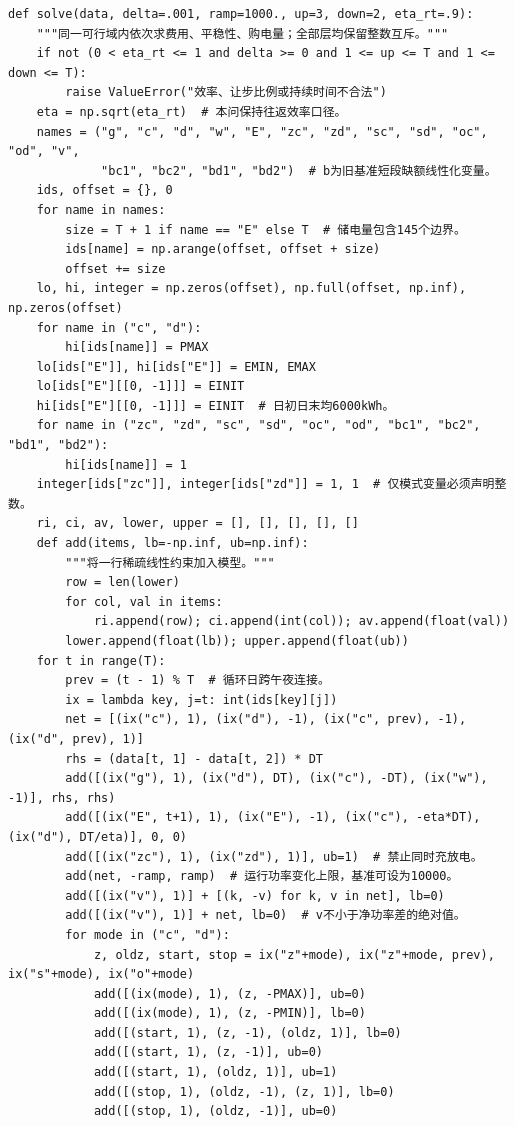 \documentclass[withoutpreface,bwprint]{cumcmthesis}
\begin{document}
\begin{appendices}
\begin{lstlisting}
def solve(data, delta=.001, ramp=1000., up=3, down=2, eta_rt=.9):
    """同一可行域内依次求费用、平稳性、购电量；全部层均保留整数互斥。"""
    if not (0 < eta_rt <= 1 and delta >= 0 and 1 <= up <= T and 1 <= down <= T):
        raise ValueError("效率、让步比例或持续时间不合法")
    eta = np.sqrt(eta_rt)  # 本问保持往返效率口径。
    names = ("g", "c", "d", "w", "E", "zc", "zd", "sc", "sd", "oc", "od", "v",
             "bc1", "bc2", "bd1", "bd2")  # b为旧基准短段缺额线性化变量。
    ids, offset = {}, 0
    for name in names:
        size = T + 1 if name == "E" else T  # 储电量包含145个边界。
        ids[name] = np.arange(offset, offset + size)
        offset += size
    lo, hi, integer = np.zeros(offset), np.full(offset, np.inf), np.zeros(offset)
    for name in ("c", "d"):
        hi[ids[name]] = PMAX
    lo[ids["E"]], hi[ids["E"]] = EMIN, EMAX
    lo[ids["E"][[0, -1]]] = EINIT
    hi[ids["E"][[0, -1]]] = EINIT  # 日初日末均6000kWh。
    for name in ("zc", "zd", "sc", "sd", "oc", "od", "bc1", "bc2", "bd1", "bd2"):
        hi[ids[name]] = 1
    integer[ids["zc"]], integer[ids["zd"]] = 1, 1  # 仅模式变量必须声明整数。
    ri, ci, av, lower, upper = [], [], [], [], []
    def add(items, lb=-np.inf, ub=np.inf):
        """将一行稀疏线性约束加入模型。"""
        row = len(lower)
        for col, val in items:
            ri.append(row); ci.append(int(col)); av.append(float(val))
        lower.append(float(lb)); upper.append(float(ub))
    for t in range(T):
        prev = (t - 1) % T  # 循环日跨午夜连接。
        ix = lambda key, j=t: int(ids[key][j])
        net = [(ix("c"), 1), (ix("d"), -1), (ix("c", prev), -1), (ix("d", prev), 1)]
        rhs = (data[t, 1] - data[t, 2]) * DT
        add([(ix("g"), 1), (ix("d"), DT), (ix("c"), -DT), (ix("w"), -1)], rhs, rhs)
        add([(ix("E", t+1), 1), (ix("E"), -1), (ix("c"), -eta*DT), (ix("d"), DT/eta)], 0, 0)
        add([(ix("zc"), 1), (ix("zd"), 1)], ub=1)  # 禁止同时充放电。
        add(net, -ramp, ramp)  # 运行功率变化上限，基准可设为10000。
        add([(ix("v"), 1)] + [(k, -v) for k, v in net], lb=0)
        add([(ix("v"), 1)] + net, lb=0)  # v不小于净功率差的绝对值。
        for mode in ("c", "d"):
            z, oldz, start, stop = ix("z"+mode), ix("z"+mode, prev), ix("s"+mode), ix("o"+mode)
            add([(ix(mode), 1), (z, -PMAX)], ub=0)
            add([(ix(mode), 1), (z, -PMIN)], lb=0)
            add([(start, 1), (z, -1), (oldz, 1)], lb=0)
            add([(start, 1), (z, -1)], ub=0)
            add([(start, 1), (oldz, 1)], ub=1)
            add([(stop, 1), (oldz, -1), (z, 1)], lb=0)
            add([(stop, 1), (oldz, -1)], ub=0)

\end{lstlisting}
\end{appendices}
\end{document}
